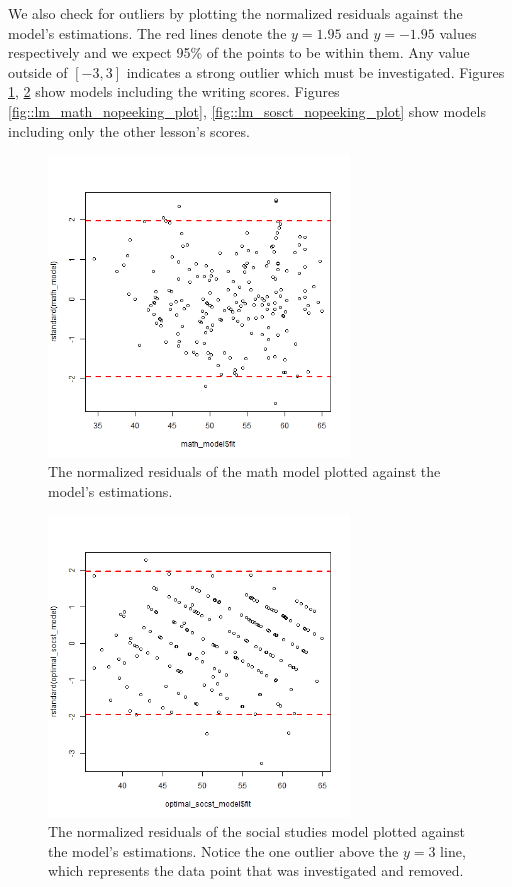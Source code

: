 \documentclass[10pt, a4paper]{article}
\begin{document}
	We also check for outliers by plotting the normalized residuals against the model's estimations. The red lines denote the $y=1.95$ and $y=-1.95$ values respectively and we expect 95\% of the points to be within them. Any value outside of $[-3,3]$ indicates a strong outlier which must be investigated. Figures \ref{fig::lm_math_plot}, \ref{fig::lm_socst_plot} show models including the writing scores. Figures \ref{fig::lm_math_nopeeking_plot}, \ref{fig::lm_sosct_nopeeking_plot} show models including only the other lesson's scores.
	
	 \begin{figure}
	 	\includegraphics[width=8cm]{lm_math_residual_plot.png}
	 	\centering
	 	\caption{The normalized residuals of the math model plotted against the model's estimations.}
	 	\label{fig::lm_math_plot}
	 \end{figure}
 
	 \begin{figure}
	 	\includegraphics[width=8cm]{lm_socst_residual_plot.png}
	 	\centering
	 	\caption{The normalized residuals of the social studies model plotted against the model's estimations. Notice the one outlier above the $y=3$ line, which represents the data point that was investigated and removed.}
	 	\label{fig::lm_socst_plot}
	 \end{figure}
 
\end{document}

